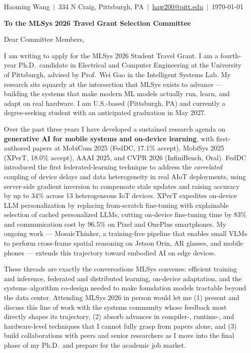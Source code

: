 \documentclass[11pt, letterpaper]{article}
\begin{document}
\begin{flushright}
Haoming Wang \,$|$\, 334 N Craig, Pittsburgh, PA \,$|$\, \href{mailto:haw200@pitt.edu}{haw200@pitt.edu} \,$|$\, \today
\end{flushright}

\vspace{-0.3em}

\noindent\textbf{To the MLSys 2026 Travel Grant Selection Committee}

\vspace{0.2em}

\noindent Dear Committee Members,

I am writing to apply for the MLSys 2026 Student Travel Grant. I am a fourth-year Ph.D.\ candidate in Electrical and Computer Engineering at the University of Pittsburgh, advised by Prof.\ Wei Gao in the Intelligent Systems Lab. My research sits squarely at the intersection that MLSys exists to advance --- building the systems that make modern ML models actually run, learn, and adapt on real hardware. I am U.S.-based (Pittsburgh, PA) and currently a degree-seeking student with an anticipated graduation in May 2027.

Over the past three years I have developed a sustained research agenda on \textbf{generative AI for mobile systems and on-device learning}, with first-authored papers at MobiCom 2025 (FedDC, 17.1\% accept), MobiSys 2025 (XPerT, 18.0\% accept), AAAI 2025, and CVPR 2026 (InfiniBench, Oral). FedDC introduced the first federated-learning technique to address the \emph{correlated} coupling of device delays and data heterogeneity in real AIoT deployments, using server-side gradient inversion to compensate stale updates and raising accuracy by up to 34\% across 13 heterogeneous IoT devices. XPerT expedites on-device LLM personalization by replacing from-scratch fine-tuning with explainable selection of cached personalized LLMs, cutting on-device fine-tuning time by 83\% and communication cost by 96.5\% on Pixel and OnePlus smartphones. My ongoing work --- MosaicThinker, a training-free pipeline that enables small VLMs to perform cross-frame spatial reasoning on Jetson Orin, AR glasses, and mobile phones --- extends this trajectory toward embodied AI on edge devices.

These threads are exactly the conversations MLSys convenes: efficient training and inference, federated and distributed learning, on-device adaptation, and the systems--algorithm co-design needed to make foundation models tractable beyond the data center. Attending MLSys 2026 in person would let me (1) present and discuss this line of work with the systems community whose feedback most directly shapes its trajectory, (2) absorb advances in compiler-, runtime-, and hardware-level techniques that I cannot fully grasp from papers alone, and (3) build collaborations with peers and senior researchers as I move into the final phase of my Ph.D.\ and prepare for the academic job market.
\end{document}
